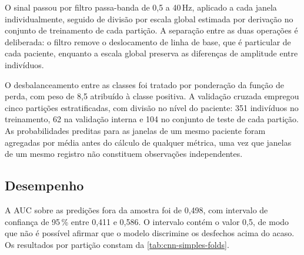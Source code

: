 O sinal passou por filtro passa-banda de 0,5 a 40\,Hz, aplicado a cada janela
individualmente, seguido de divisão por escala global estimada por derivação
no conjunto de treinamento de cada partição. A separação entre as duas
operações é deliberada: o filtro remove o deslocamento de linha de base, que
é particular de cada paciente, enquanto a escala global preserva as
diferenças de amplitude entre indivíduos.

O desbalanceamento entre as classes foi tratado por ponderação da função de
perda, com peso de 8,5 atribuído à classe positiva. A validação cruzada
empregou cinco partições estratificadas, com divisão no nível do paciente:
351 indivíduos no treinamento, 62 na validação interna e 104 no conjunto de
teste de cada partição. As probabilidades preditas para as janelas de um
mesmo paciente foram agregadas por média antes do cálculo de qualquer
métrica, uma vez que janelas de um mesmo registro não constituem observações
independentes.

\subsection{Desempenho}
\label{subsec:desempenho-cnn-simples}

A \gls{AUC} sobre as predições fora da amostra foi de 0,498, com intervalo de
confiança de 95\,\% entre 0,411 e 0,586. O intervalo contém o valor 0,5, de
modo que não é possível afirmar que o modelo discrimine os desfechos acima do
acaso. Os resultados por partição constam da \autoref{tab:cnn-simples-folds}.

